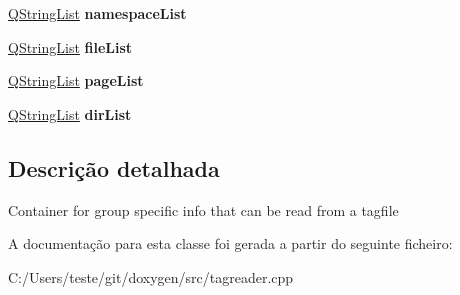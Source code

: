 \begin{DoxyCompactItemize}
\item 
\hypertarget{class_tag_group_info_ab4d7297c6d12af6e9780ef8994e6c439}{\hyperlink{class_q_string_list}{Q\-String\-List} {\bfseries namespace\-List}}\label{class_tag_group_info_ab4d7297c6d12af6e9780ef8994e6c439}

\item 
\hypertarget{class_tag_group_info_aa9b4edd93d5bdffdcc1c6a0488321ae4}{\hyperlink{class_q_string_list}{Q\-String\-List} {\bfseries file\-List}}\label{class_tag_group_info_aa9b4edd93d5bdffdcc1c6a0488321ae4}

\item 
\hypertarget{class_tag_group_info_a4be547d04a0a544183a3cffcacd55c35}{\hyperlink{class_q_string_list}{Q\-String\-List} {\bfseries page\-List}}\label{class_tag_group_info_a4be547d04a0a544183a3cffcacd55c35}

\item 
\hypertarget{class_tag_group_info_a1954a38c4b93c7bb29fa54a145e69bdd}{\hyperlink{class_q_string_list}{Q\-String\-List} {\bfseries dir\-List}}\label{class_tag_group_info_a1954a38c4b93c7bb29fa54a145e69bdd}

\end{DoxyCompactItemize}


\subsection{Descrição detalhada}
Container for group specific info that can be read from a tagfile 

A documentação para esta classe foi gerada a partir do seguinte ficheiro\-:\begin{DoxyCompactItemize}
\item 
C\-:/\-Users/teste/git/doxygen/src/tagreader.\-cpp\end{DoxyCompactItemize}
